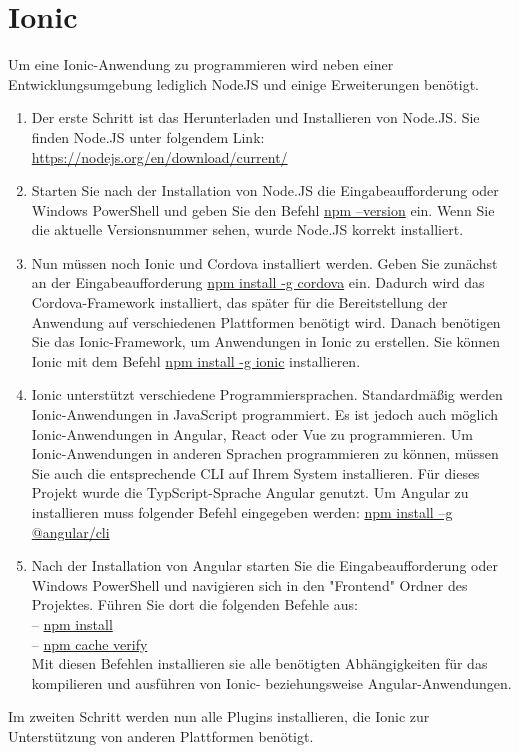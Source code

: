 \section{Ionic}\label{IonicInstal}

Um eine Ionic-Anwendung zu programmieren wird neben einer Entwicklungsumgebung lediglich NodeJS und einige Erweiterungen benötigt.

\begin{enumerate}
    \item Der erste Schritt ist das Herunterladen und Installieren von Node.JS. Sie finden Node.JS unter folgendem Link:
    \href{https://nodejs.org/en/download/current/}{https://nodejs.org/en/download/current/}    
    
    \item Starten Sie nach der Installation von Node.JS die Eingabeaufforderung oder Windows PowerShell und geben Sie den Befehl \underline{npm --version} ein. Wenn Sie die aktuelle Versionsnummer sehen, wurde Node.JS korrekt installiert. 

    \item  Nun müssen noch Ionic und Cordova installiert werden. Geben Sie zunächst an der Eingabeaufforderung \underline{npm install -g cordova} ein. Dadurch wird das Cordova-Framework installiert, das später für die Bereitstellung der Anwendung auf verschiedenen Plattformen benötigt wird. Danach benötigen Sie das Ionic-Framework, um Anwendungen in Ionic zu erstellen. Sie können Ionic mit dem Befehl \underline{npm install -g ionic} installieren. 
    
    \item Ionic unterstützt verschiedene Programmiersprachen. Standardmäßig werden Ionic-Anwendungen in JavaScript programmiert. Es ist jedoch auch möglich Ionic-Anwendungen in Angular, React oder Vue zu programmieren. Um Ionic-Anwendungen in anderen Sprachen programmieren zu können, müssen Sie auch die entsprechende CLI auf Ihrem System installieren. Für dieses Projekt wurde die TypScript-Sprache Angular genutzt. Um Angular zu installieren muss folgender Befehl eingegeben werden: \underline{npm install –g @angular/cli}  
    
    \item Nach der Installation von Angular starten Sie die Eingabeaufforderung oder Windows PowerShell und navigieren sich in den "Frontend" Ordner des Projektes. Führen Sie dort die folgenden Befehle aus:\\
    -- \underline{npm install}\\
    -- \underline{npm cache verify}\\
    Mit diesen Befehlen installieren sie alle benötigten Abhängigkeiten für das kompilieren und ausführen von Ionic- beziehungsweise Angular-Anwendungen.

    
\end{enumerate}{}
Im zweiten Schritt werden nun alle Plugins installieren, die Ionic zur Unterstützung von anderen Plattformen benötigt.

